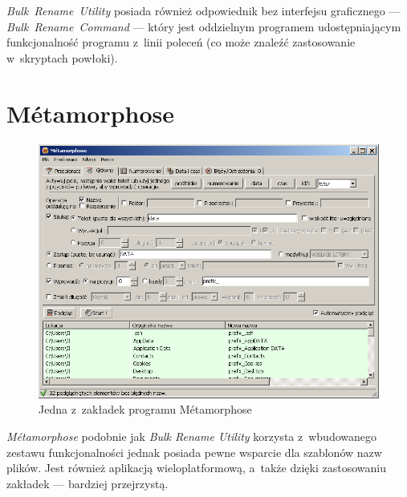 \textit{Bulk~Rename~Utility} posiada również odpowiednik bez interfejsu graficznego --- \textit{Bulk~Rename~Command} --- który jest oddzielnym programem udostępniającym funkcjonalność programu z~linii poleceń (co może znaleźć zastosowanie w~skryptach powłoki).

\section{Métamorphose}
\begin{figure}[h]
\begin{center}
\includegraphics[scale=0.75]{img/metamorphose_window.png}
\end{center}
\caption{Jedna z~zakładek programu Métamorphose}
\end{figure}

\par
\textit{Métamorphose} podobnie jak \textit{Bulk Rename Utility} korzysta z~wbudowanego zestawu funkcjonalności jednak posiada pewne wsparcie dla szablonów nazw plików. Jest również aplikacją wieloplatformową, a~także dzięki zastosowaniu zakładek --- bardziej przejrzystą.

